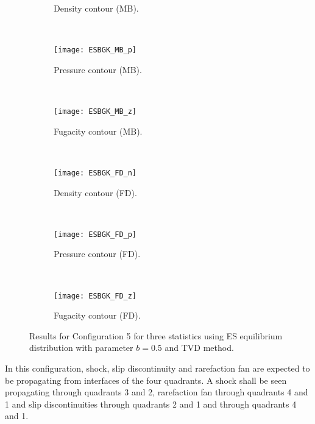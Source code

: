 \documentclass{rsproca}%
\begin{document}
\begin{figure}
\begin{subfigure}[b]{0.32\textwidth}
                \caption{Density contour (MB).}
                \label{fig:5ESBGK_MB_n}
        \end{subfigure}
        ~ %
        \begin{subfigure}[b]{0.32\textwidth}
                \centering
                \texttt{[image: ESBGK\_MB\_p]}
                \caption{Pressure contour (MB). }
                \label{fig:5ESBGK_MB_p}
        \end{subfigure}
				~ %
        \begin{subfigure}[b]{0.32\textwidth}
                \centering
                \texttt{[image: ESBGK\_MB\_z]}
                \caption{Fugacity contour (MB).}
                \label{fig:5ESBGK_MB_z}
        \end{subfigure}
        ~ %
        \begin{subfigure}[b]{0.32\textwidth}
                \centering
                \texttt{[image: ESBGK\_FD\_n]}
                \caption{Density contour (FD).}
                \label{fig:5ESBGK_FD_n}
        \end{subfigure}
        ~ %
        \begin{subfigure}[b]{0.32\textwidth}
                \centering
                \texttt{[image: ESBGK\_FD\_p]}
                \caption{Pressure contour (FD).}
                \label{fig:5ESBGK_FD_p}
        \end{subfigure}
				~ %
        \begin{subfigure}[b]{0.32\textwidth}
                \centering
                \texttt{[image: ESBGK\_FD\_z]}
                \caption{Fugacity contour (FD).}
                \label{fig:5ESBGK_FD_z}
        \end{subfigure}
				\caption{Results for Configuration 5 for three statistics using ES equilibrium distribution with parameter $b=0.5$ and TVD method.} \label{fig:test_configuration5}
\end{figure}
In this configuration, shock, slip discontinuity and rarefaction fan are expected to be propagating from interfaces of the four quadrants. A shock shall be seen propagating through quadrants 3 and 2, rarefaction fan through quadrants 4 and 1 and slip discontinuities through quadrants 2 and 1 and through quadrants 4 and 1.
\end{document}
